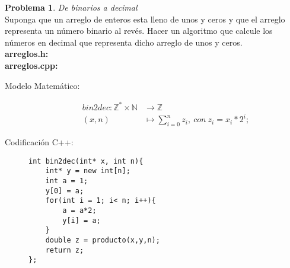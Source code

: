 \documentclass{article}
\theoremstyle{plain}
\theoremstyle{definition}
\newtheorem{problem}{Problema}
\begin{document}
\begin{problem} \emph{De binarios a decimal}\\
Suponga que un arreglo de enteros esta lleno de unos y ceros y que el arreglo representa un número binario al revés. Hacer un algoritmo que calcule los números en decimal que representa dicho arreglo de unos y ceros.\\
\textbf{arreglos.h:}\ \\
\textbf{arreglos.cpp:}\ 
%
\begin{description}
\item[Modelo Matemático:]
%
\begin{align*}
bin2dec: \mathbb{Z}^*\times\mathbb{N} &\to \mathbb{Z}\\
(x,n) &\mapsto \sum_{i=0}^n z_i,\ con\ z_i = x_i * 2^i;
\end{align*}
%
\item[Codificación \textsf{C++}:]\hfill
%
\begin{verbatim}
int bin2dec(int* x, int n){
    int* y = new int[n];
    int a = 1;
    y[0] = a;
    for(int i = 1; i< n; i++){
        a = a*2;
        y[i] = a;
    }
    double z = producto(x,y,n);
    return z;
};
\end{verbatim}
\end{description}
\end{problem}
\end{document}
